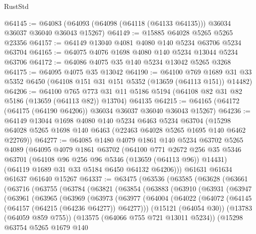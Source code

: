 \begin{lexlean}{RustStd}
\begin{coremodule}
@64145 := @64083 (@64093 (@64098 (@64118 (@64133 @64135))) @36034 @36037 @36040 @36043 @15267)
@64149 := @15885 @64028 @5265 @5265 @23356
@64157 := @64149 @13040 @4081 @4080 @140 @5234 @63706 @5234 @63704
@64165 := @64075 @4076 @1698 @4080 @140 @5234 @13044 @5234 @63706
@64172 := @64086 @4075 @35 @140 @5234 @13042 @5265 @3268
@64175 := @64095 @4075 @35 @13042
@64190 := @64100
    @769
    @1689
    @31
    @33
    @5352
    @6450
    (@64108 @151 @31 @151 @5352 (@13659 (@64113 @151)) @14482)
@64206 := @64100
    @765
    @773
    @31
    @11
    @5186
    @5194
    (@64108 @82 @31 @82 @5186 (@13659 (@64113 @82)) @13704)
    @64135
@64215 := @64165 (@64172 (@64175 (@64190 @64206)) @36034 @36037 @36040 @36043 @15267)
@64236 := @64149
    @13044
    @1698
    @4080
    @140
    @5234
    @6463
    @5234
    @63704
    (@15298 @64028 @5265 @1698 @140 @6463 (@22463 @64028 @5265 @1695 @140 @6462 @22769))
@64277 := @64085
    @1480
    @4079
    @1861
    @140
    @5234
    @63702
    @5265
    @4089
    (@64095
      @4079
      @1861
      @63702
      (@64100
        @771
        @2672
        @256
        @35
        @5346
        @63701
        (@64108 @96 @256 @96 @5346 (@13659 (@64113 @96)) @14431)
        (@64119 @1689 @31 @33 @5184 @6450 @64132 @64206)))
    @61631
    @61634
    @61637
    @61640
    @15267
@64337 := @63475
    (@63536
      (@63585
        (@63628
          (@63661
            (@63716
              (@63755
                (@63784
                  (@63821
                    (@63854
                      (@63883
                        (@63910
                          (@63931
                            (@63947
                              (@63961
                                (@63965
                                  (@63969
                                    (@63973
                                      (@63977
                                        (@64004
                                          (@64022
                                            (@64072
                                              (@64145 (@64157 (@64215 (@64236 @64277)) @64277)))
                                            (@15121 (@64054 @30))
                                            (@13783 (@64059 @859 @755))
                                            (@13575 (@64066 @755 @721 @13011 @5234))
                                            (@15298
                                              @63754
                                              @5265
                                              @1679
                                              @140

\end{coremodule}
\end{lexlean}
